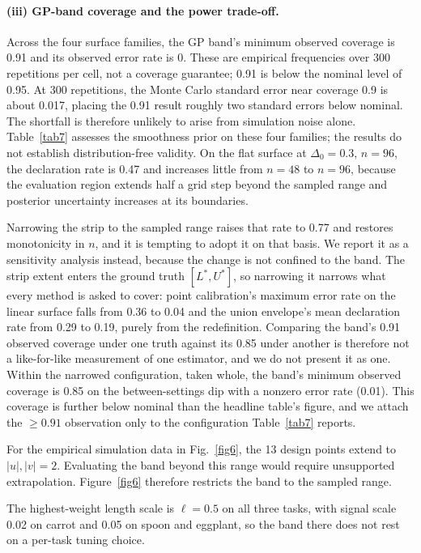 \documentclass[pdflatex,iicol,sn-apa]{sn-jnl}
\theoremstyle{remark}
\begin{document}
\paragraph{(iii) GP-band coverage and the power trade-off.}
Across the four surface families, the GP band's minimum observed coverage is 0.91 and its
observed error rate is 0. These are empirical frequencies over 300 repetitions per cell,
not a coverage guarantee; 0.91 is below the nominal level of 0.95. At 300 repetitions,
the Monte Carlo standard error near coverage 0.9 is about 0.017, placing the 0.91 result
roughly two standard errors below nominal. The shortfall is therefore unlikely to arise from
simulation noise alone. Table~\ref{tab7} assesses the smoothness prior on these four families;
the results do not establish distribution-free validity. On the flat surface at
$\Delta_0 = 0.3$, $n = 96$, the declaration rate is 0.47 and increases little from $n = 48$
to $n = 96$, because the evaluation region extends half a grid step beyond the sampled range
and posterior uncertainty increases at its boundaries.

Narrowing the strip to the sampled range raises that rate to 0.77 and restores monotonicity in $n$,
and it is tempting to adopt it on that basis. We report it as a sensitivity analysis instead,
because the change is not confined to the band. The strip extent enters the ground truth
$[L^*, U^*]$, so narrowing it narrows what every method is asked to cover: point calibration's
maximum error rate on the linear surface falls from 0.36 to 0.04 and the union envelope's mean
declaration rate from 0.29 to 0.19, purely from the redefinition. Comparing the band's 0.91 observed
coverage under one truth against its 0.85 under another is therefore not a like-for-like measurement
of one estimator, and we do not present it as one. Within the narrowed configuration, taken whole,
the band's minimum observed coverage is 0.85 on the between-settings dip with a nonzero
error rate (0.01). This coverage is further below nominal than the headline table's figure, and we attach the
$\ge 0.91$ observation only to the configuration Table~\ref{tab7} reports.

For the empirical simulation data in Fig.~\ref{fig6}, the 13 design points extend to
$|u|, |v| = 2$. Evaluating the band beyond this range would require unsupported extrapolation.
Figure~\ref{fig6} therefore restricts the band to the sampled range.

The highest-weight length scale is $\ell = 0.5$ on all three tasks, with signal scale 0.02 on carrot
and 0.05 on spoon and eggplant, so the band there does not rest on a per-task tuning choice.
\end{document}
